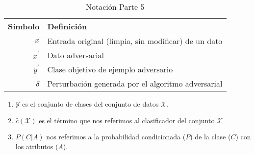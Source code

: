\begin{table}[H]
    \begin{center}
        \begin{tabularx}{\textwidth}{|r|X|}
            \hline
            \textbf{Símbolo} & \textbf{Definición}                                 \\
            \hline %
            $ x $            & Entrada original (limpia, sin modificar) de un dato \\
            $ x^{\prime} $   & Dato adversarial                                    \\
            $ y^{\prime} $   & Clase objetivo de ejemplo adversario                \\
            $ \delta $       & Perturbación generada por el algoritmo adversarial  \\
            \hline
        \end{tabularx}
        \caption{Notación Parte 5}
        \label{tab:nnotation-part-5}
    \end{center}
\end{table}






\begin{enumerate}
    \item $\mathcal{Y}$ es el conjunto de clases del conjunto de datos $\mathcal{X}$.
    \item $\hat{c}(\mathcal{X})$ es el término que nos referimos al clasificador del conjunto $\mathcal{X}$
    \item $P(C|A)$ nos referimos a la probabilidad condicionada ($P$) de la clase ($C$) con los atributos ($A$).
\end{enumerate}


